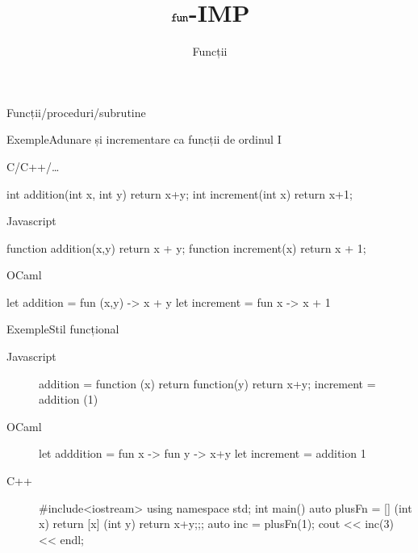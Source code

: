 \documentclass[xcolor=pdftex,romanian,colorlinks]{beamer}
\title[SLP---Funcții]{$\mathrel{\text{\ttfamily fun}}$-IMP}
\subtitle{Funcții}
\begin{document}
\maketitle

\begin{section}{Funcții/proceduri/subrutine}

 \lstset{
               language=Caml,
               basicstyle=\small,
               tabsize=2,
               columns=flexible,
               mathescape=false,
	      upquote=true,
    }
\begin{frame}[fragile]{Exemple}{Adunare și incrementare ca funcții de ordinul I}
\begin{block}{C/C++/\ldots}
\begin{asciic}
int addition(int x, int y) { return x+y; }
int increment(int x) { return x+1; }
\end{asciic}
\end{block}

\begin{block}{Javascript}
\begin{asciijs}
function addition(x,y) { return x + y; }
function increment(x) { return x + 1; }
\end{asciijs}
\end{block}

\begin{block}{OCaml}
\begin{asciiml}
let addition = fun (x,y) -> x + y
let increment = fun x -> x + 1
\end{asciiml}
\end{block}

\end{frame}

\begin{frame}[fragile]{Exemple}{Stil funcțional}

\begin{description}
\item[Javascript]
\begin{asciijs}
addition = function (x) { return function(y) { return x+y; } }
increment = addition (1)
\end{asciijs}

\item[OCaml]
\begin{asciiml}
let adddition = fun x -> fun y -> x+y
let increment = addition 1
\end{asciiml}

\item[C++]
\begin{asciic}
#include<iostream>
using namespace std;
int main()
{
    auto plusFn = [] (int x) { return [x] (int y) {return x+y;};};
    auto inc = plusFn(1);
    cout << inc(3) << endl;
}
\end{asciic}
\end{description}
\end{frame}


\end{section}
\end{document}
